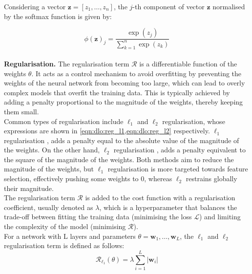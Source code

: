 Considering a vector $\mathbf{z} = [z_1, \dots, z_n]$, the $j$-th component of
vector $\mathbf{z}$ normalised by the softmax function is given by: 

\begin{equation}
  \label{eqn:dlo:softmax}
  \phi(\mathbf{z})_j = \frac{\exp(z_j)}{\displaystyle\sum_{k=1}^{n} \exp(z_k)}
\end{equation}\\

\noindent \textbf{Regularisation.} The regularisation term $\mathcal{R}$ is a
differentiable function of the weights $\theta$. It acts as a control mechanism
to avoid overfitting by preventing the weights of the neural network from
becoming too large, which can lead to overly complex models that overfit the
training data. This is typically achieved by adding a penalty proportional to
the magnitude of the weights, thereby keeping them small.\\

Common types of regularisation include $\ell_1$ and $\ell_2$ regularisation,
whose expressions are shown in \cref{eqn:dlo:reg_l1,eqn:dlo:reg_l2}
respectively. $\ell_1$ regularisation \cite{tibshirani1996regression}, adds a
penalty equal to the absolute value of the magnitude of the weights. On the
other hand, $\ell_2$ regularisation \cite{hoerl1970ridge}, adds a penalty
equivalent to the square of the magnitude of the weights. Both methods aim to
reduce the magnitude of the weights, but $\ell_1$ regularisation is more
targeted towards feature selection, effectively pushing some weights to $0$,
whereas $\ell_2$ restrains globally their magnitude.\\

The regularisation term $\mathcal{R}$ is added to the cost function with a
regularisation coefficient, usually denoted as $\lambda$, which is a
hyperparameter that balances the trade-off between fitting the training data
(minimising the loss $\mathcal{L}$) and limiting the complexity of the model
(minimising $\mathcal{R}$).\\

For a network with L layers and parameters $\theta={\mathbf{w}_1, \dots,
\mathbf{w}_L}$, the $\ell_1$ and $\ell_2$ regularisation term is defined as
follows:\\

\begin{equation}
  \label{eqn:dlo:reg_l1}
  \mathcal{R}_{\ell_1}(\theta) = \lambda \sum_{i=1}^{L} \left| \mathbf{w}_i \right|
\end{equation}\\

